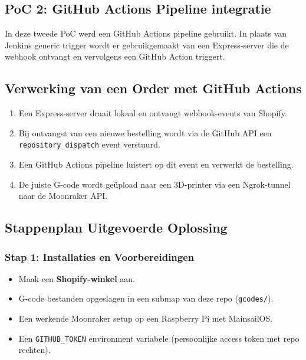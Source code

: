 \begin{enumerate}
\section{PoC 2: GitHub Actions Pipeline integratie}

In deze tweede PoC werd een GitHub Actions pipeline gebruikt. In plaats van Jenkins generic trigger wordt er gebruikgemaakt van een Express-server die de webhook ontvangt en vervolgens een GitHub Action triggert.

\subsection{Verwerking van een Order met GitHub Actions}

\begin{enumerate}
    \item Een Express-server draait lokaal en ontvangt webhook-events van Shopify.
    \item Bij ontvangst van een nieuwe bestelling wordt via de GitHub API een \texttt{repository\_dispatch} event verstuurd.
    \item Een GitHub Actions pipeline luistert op dit event en verwerkt de bestelling.
    \item De juiste G-code wordt geüpload naar een 3D-printer via een Ngrok-tunnel naar de Moonraker API.
\end{enumerate}

\subsection{Stappenplan Uitgevoerde Oplossing}

\subsubsection{Stap 1: Installaties en Voorbereidingen}

\begin{itemize}
    \item Maak een \textbf{Shopify-winkel} aan.
    \item G-code bestanden opgeslagen in een submap van deze repo (\texttt{gcodes/}).
    \item Een werkende Moonraker setup op een Raspberry Pi met MainsailOS.
    \item Een \texttt{GITHUB\_TOKEN} environment variabele (persoonlijke access token met repo rechten).
\end{itemize}


\end{enumerate}

